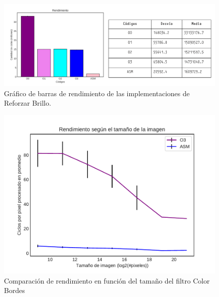 \documentclass[a4paper]{article}
\begin{document}
\begin{figure}[h!]
	\includegraphics[scale=0.55]{img/ReforzarBrilloConTabla.pdf}
	\caption{Gráfico de barras de rendimiento de las implementaciones de Reforzar Brillo.}
\end{figure}


\begin{figure}[h!]
		\centering
		\includegraphics[scale= 0.55]{img/ImagenFantasmaO3vsASM.pdf}
		\caption{Comparación de rendimiento en función del tamaño del filtro Color Bordes}
\end{figure}	
\end{document}
